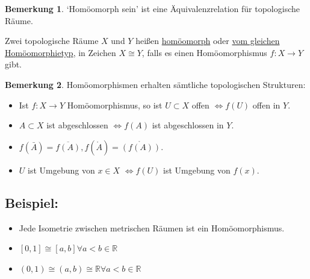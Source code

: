 \documentclass[a4paper,11pt,notitlepage]{report}
\theoremstyle{definition}
\newtheorem{remark}{Bemerkung}[chapter]
\newcommand{\R}{{\ensuremath{\mathbb{R}}}}
\newenvironment{bsp}[1]
{
\setlength{\fboxsep}{10pt}
\subsection*{Beispiel: #1}
\begin{upshape}
}
{
\end{upshape}
}
\newenvironment{definition}[1]{
	\begin{definitions}
	\marginnote{\emph{#1}}
}{\end{definitions}}
\begin{document}
\begin{remark}
	`Homöomorph sein' ist eine Äquivalenzrelation für topologische Räume.
\end{remark}

\begin{definition}{homöomorph}
	Zwei topologische Räume $X$ und $Y$ heißen \underline{homöomorph} oder \underline{vom gleichen Homöomorphietyp}, in Zeichen $X \cong Y$, falls es einen Homöomorphismus $f \colon X \rightarrow Y$ gibt.
\end{definition}

\begin{remark}
	Homöomorphismen erhalten sämtliche topologischen Strukturen:
	\begin{itemize}
		\item Ist $f \colon X \rightarrow Y$ Homöomorphismus, so ist $U \subset X$ offen $\Leftrightarrow f(U)$ offen in $Y$.
		\item $A \subset X$ ist abgeschlossen $\Leftrightarrow f(A)$ ist abgeschlossen in $Y$.
		\item $f(\bar{A}) = \overline{f(A)}, f(\mathring A) = \mathring{\left(f(A)\right)}$.
		\item $U$ ist Umgebung von $x \in X$ $\Leftrightarrow f(U)$ ist Umgebung von $f(x)$.
	\end{itemize}
\end{remark}

\begin{bsp}{}
	\begin{itemize}
		\item Jede Isometrie zwischen metrischen Räumen ist ein Homöomorphismus.
		\item $[0,1] \cong [a,b] \forall a < b \in \R$
		\item $(0,1) \cong (a,b) \cong \R \forall a < b \in \R$
	\end{itemize}
\end{bsp}
\end{document}
